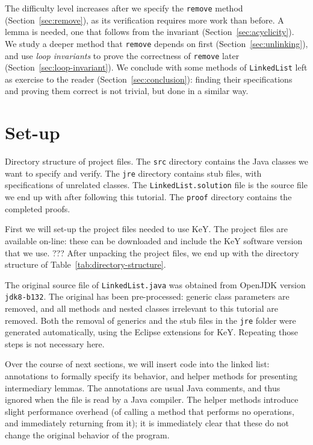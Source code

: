 \documentclass[runningheads]{llncs}
\begin{document}
The difficulty level increases after we specify the \texttt{remove} method (Section~\ref{sec:remove}), as its verification requires more work than before. A lemma is needed, one that follows from the invariant (Section~\ref{sec:acyclicity}). We study a deeper method that \texttt{remove} depends on first (Section~\ref{sec:unlinking}), and use \emph{loop invariants} to prove the correctness of \texttt{remove} later (Section~\ref{sec:loop-invariant}). We conclude with some methods of \texttt{LinkedList} left as exercise to the reader (Section~\ref{sec:conclusion}): finding their specifications and proving them correct is not trivial, but done in a similar way.

\section{Set-up}\label{sec:setup}

\begin{table}
\medskip
    \caption{Directory structure of project files. The \texttt{src} directory contains the Java classes we want to specify and verify. The \texttt{jre} directory contains stub files, with specifications of unrelated classes. The \texttt{LinkedList.solution} file is the source file we end up with after following this tutorial. The \texttt{proof} directory contains the completed proofs.}
    \label{tab:directory-structure}
\end{table}

First we will set-up the project files needed to use KeY. The project files are available on-line: these can be downloaded and include the KeY software version that we use. ??? After unpacking the project files, we end up with the directory structure of Table~\ref{tab:directory-structure}.

The original source file of \texttt{LinkedList.java} was obtained from OpenJDK version \texttt{jdk8-b132}. The original has been pre-processed: generic class parameters are removed, and all methods and nested classes irrelevant to this tutorial are removed. Both the removal of generics and the stub files in the \texttt{jre} folder were generated automatically, using the Eclipse extensions for KeY. Repeating those steps is not necessary here.

Over the course of next sections, we will insert code into the linked list: annotations to formally specify its behavior, and helper methods for presenting intermediary lemmas. The annotations are usual Java comments, and thus ignored when the file is read by a Java compiler. The helper methods introduce slight performance overhead (of calling a method that performs no operations, and immediately returning from it); it is immediately clear that these do not change the original behavior of the program.
\end{document}
